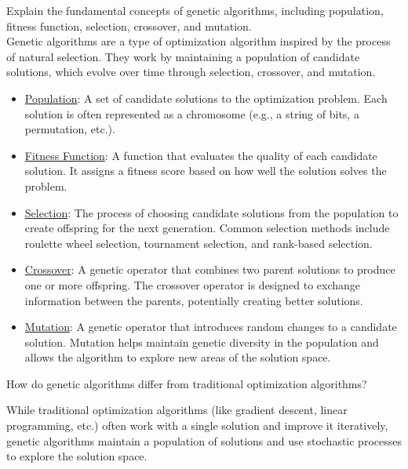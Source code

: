\begin{ejercicio}
    Explain the fundamental concepts of genetic algorithms, including population, fitness function, selection, crossover, and mutation.\\

    Genetic algorithms are a type of optimization algorithm inspired by the process of natural selection. They work by maintaining a population of candidate solutions, which evolve over time through selection, crossover, and mutation.
    \begin{itemize}
        \item \ul{Population}: A set of candidate solutions to the optimization problem. Each solution is often represented as a chromosome (e.g., a string of bits, a permutation, etc.).
        \item \ul{Fitness Function}: A function that evaluates the quality of each candidate solution. It assigns a fitness score based on how well the solution solves the problem.
        \item \ul{Selection}: The process of choosing candidate solutions from the population to create offspring for the next generation. Common selection methods include roulette wheel selection, tournament selection, and rank-based selection.
        \item \ul{Crossover}: A genetic operator that combines two parent solutions to produce one or more offspring. The crossover operator is designed to exchange information between the parents, potentially creating better solutions.
        \item \ul{Mutation}: A genetic operator that introduces random changes to a candidate solution. Mutation helps maintain genetic diversity in the population and allows the algorithm to explore new areas of the solution space.
    \end{itemize}
\end{ejercicio}
\begin{ejercicio}
    How do genetic algorithms differ from traditional optimization algorithms?

    While traditional optimization algorithms (like gradient descent, linear programming, etc.) often work with a single solution and improve it iteratively, genetic algorithms maintain a population of solutions and use stochastic processes to explore the solution space.
\end{ejercicio}
